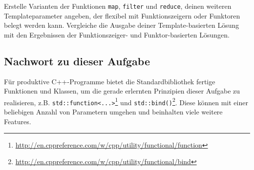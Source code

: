 Erstelle Varianten der Funktionen \lstinline{map}, \lstinline{filter} und \lstinline{reduce}, deinen weiteren Templateparameter angeben, der flexibel mit Funktionszeigern oder Funktoren belegt werden kann.
%
%
Vergleiche die Ausgabe deiner Template-basierten Lösung mit den Ergebnissen der Funktionszeiger- und Funktor-basierten Lösungen.

\subsection*{Nachwort zu dieser Aufgabe}
Für produktive C++-Programme bietet die Standardbibliothek fertige Funktionen und Klassen, um die gerade erlernten Prinzipien dieser Aufgabe zu realisieren, z.B. \lstinline{std::function<...>}\footnote{\url{http://en.cppreference.com/w/cpp/utility/functional/function}} und \lstinline{std::bind()}\footnote{\url{http://en.cppreference.com/w/cpp/utility/functional/bind}}.
Diese können mit einer beliebigen Anzahl von Parametern umgehen und beinhalten viele weitere Features.
